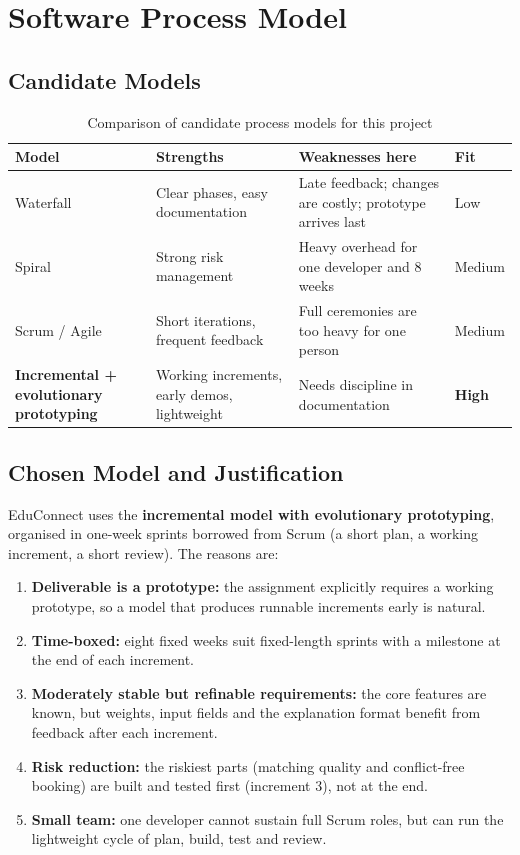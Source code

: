 \documentclass[11pt,a4paper]{article}
\begin{document}
\section{Software Process Model}
\subsection{Candidate Models}
\begin{table}[H]
\centering
\caption{Comparison of candidate process models for this project}
\small
\begin{tabularx}{\linewidth}{@{}l X X X@{}}
\toprule
\textbf{Model} & \textbf{Strengths} & \textbf{Weaknesses here} & \textbf{Fit}\\ \midrule
Waterfall \cite{sommerville2016} & Clear phases, easy documentation & Late feedback; changes are costly; prototype arrives last & Low\\
Spiral \cite{boehm1988} & Strong risk management & Heavy overhead for one developer and 8 weeks & Medium\\
Scrum / Agile \cite{agile2001,scrumguide2020} & Short iterations, frequent feedback & Full ceremonies are too heavy for one person & Medium\\
\textbf{Incremental + evolutionary prototyping} \cite{pressman2020} & Working increments, early demos, lightweight & Needs discipline in documentation & \textbf{High}\\
\bottomrule
\end{tabularx}
\end{table}

\subsection{Chosen Model and Justification}
EduConnect uses the \textbf{incremental model with evolutionary prototyping}, organised in one-week sprints borrowed from Scrum (a short plan, a working increment, a short review). The reasons are:
\begin{enumerate}
  \item \textbf{Deliverable is a prototype:} the assignment explicitly requires a working prototype, so a model that produces runnable increments early is natural.
  \item \textbf{Time-boxed:} eight fixed weeks suit fixed-length sprints with a milestone at the end of each increment.
  \item \textbf{Moderately stable but refinable requirements:} the core features are known, but weights, input fields and the explanation format benefit from feedback after each increment.
  \item \textbf{Risk reduction:} the riskiest parts (matching quality and conflict-free booking) are built and tested first (increment 3), not at the end.
  \item \textbf{Small team:} one developer cannot sustain full Scrum roles, but can run the lightweight cycle of plan, build, test and review.
\end{enumerate}
\end{document}
